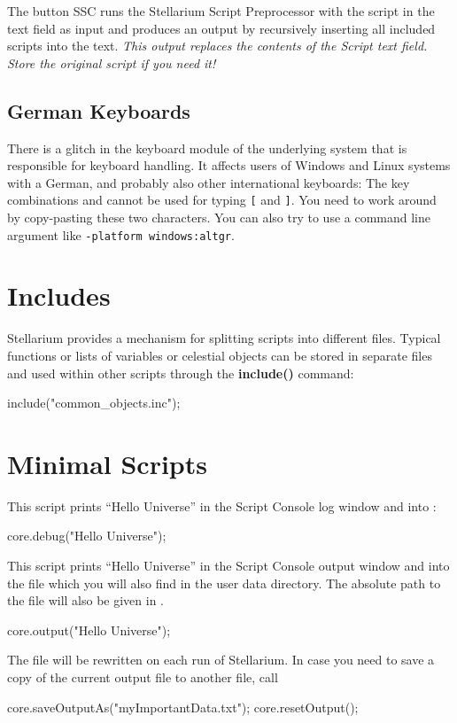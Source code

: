 The button SSC runs the Stellarium Script Preprocessor with the script in the text
field as input and produces an output by recursively inserting all
included scripts into the text.
\emph{This output replaces the contents of the Script text field. Store the original script if you need it!}

\subsection{German Keyboards}

There is a glitch in the keyboard module of the underlying system that
is responsible for keyboard handling. It affects users of Windows and
Linux systems with a German, and probably also other international
keyboards: The key combinations  and  cannot
be used for typing \verb+[+ and \verb+]+. You need to work around by
copy-pasting these two characters. You can also try to use a command 
line argument like \texttt{-platform windows:altgr}.

\section{Includes}
\label{sec:scripting:includes}

Stellarium provides a mechanism for splitting scripts into different
files. Typical functions or lists of variables or celestial objects can be stored in
separate  files and used within other scripts through the
\textbf{include()} command:
\begin{script}
include("common_objects.inc");
\end{script}


\section{Minimal Scripts}
\label{sec:scripting:MinimalScript}
This script prints ``Hello Universe'' in the Script Console log window and into :
\begin{script}
core.debug("Hello Universe");
\end{script}

\noindent This script prints ``Hello Universe'' in the Script Console output window and into the file  
which you will also find in the user data directory. The absolute path to the file will also be given in .
\begin{script}
core.output("Hello Universe");
\end{script}
The file  will be rewritten on each run of Stellarium. In case you need to save a copy of the current output file to another file, call 
\begin{script}
core.saveOutputAs("myImportantData.txt");
core.resetOutput();
\end{script}


